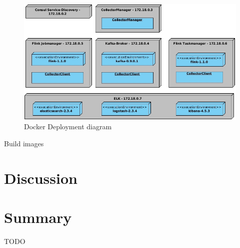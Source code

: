 \begin{figure}[H]
	\centering
	\includegraphics[width=1.0\textwidth]{../uml/deployment-diagram.jpg}
	\caption{Docker Deployment diagram}
	\label{img:deployment-diagram}
\end{figure}

Build images



%
%

\section{Discussion}
\section{Summary}

TODO

